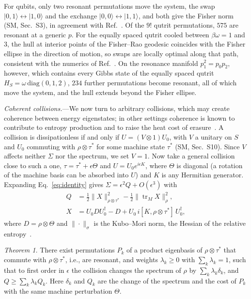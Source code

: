 \documentclass[aps,prl,reprint,superscriptaddress,amsmath,amssymb]{revtex4-2}
\newcommand{\Tr}{\operatorname{tr}}
\begin{document}
For qubits, only two resonant permutations move the system, the swap $|0,1\rangle\leftrightarrow|1,0\rangle$ and the
exchange $|0,0\rangle\leftrightarrow|1,1\rangle$, and both give the Fisher norm (SM, Sec.~S3), in agreement with
Ref.~\cite{Taranto2025}. Of the $9!$ qutrit permutations, $575$ are resonant at a generic $p$. For the equally spaced
qutrit cooled between $\beta\omega=1$ and $3$, the hull at interior points of the Fisher--Rao geodesic coincides with
the Fisher ellipse in the direction of motion, so swaps are locally optimal along that path, consistent with the
numerics of Ref.~\cite{Taranto2025}. On the resonance manifold $p_1^2=p_0p_2$, however, which contains every Gibbs
state of the equally spaced qutrit $H_S=\omega\,\mathrm{diag}(0,1,2)$, $234$ further permutations become resonant, all
of which move the system, and the hull extends beyond the Fisher ellipse.

\emph{Coherent collisions.}---We now turn to arbitrary collisions, which may create coherence between energy
eigenstates; in other settings coherence is known to contribute to entropy production and to raise the heat cost of
erasure~\cite{Santos2019,VanVuSaito2022}. A collision is dissipationless if and only if $U=(V\otimes1)U_0$, with $V$ a
unitary on $S$ and $U_0$ commuting with $\rho\otimes\tau^*$ for some machine state $\tau^*$ (SM, Sec.~S10). Since $V$
affects neither $\Sigma$ nor the spectrum, we set $V=1$. Now take a general collision close to such a one,
$\tau=\tau^*+\epsilon\Theta$ and $U=U_0e^{i\epsilon K}$, where $\Theta$ is diagonal (a rotation of the machine basis can
be absorbed into $U$) and $K$ is any Hermitian generator. Expanding Eq.~\eqref{eq:identity} gives
$\Sigma=\epsilon^2Q+O(\epsilon^3)$ with
\begin{equation}
\begin{aligned}
Q&=\tfrac12\|X\|^2_{\rho\otimes\tau^*}-\tfrac12\|\Tr_MX\|^2_{\rho},\\
X&=U_0DU_0^\dagger-D+U_0\,i[K,\rho\otimes\tau^*]\,U_0^\dagger,
\end{aligned}
\label{eq:Q}
\end{equation}
where $D=\rho\otimes\Theta$ and $\|\cdot\|_\sigma$ is the Kubo--Mori norm, the Hessian of the relative
entropy~\cite{Petz1996}.

\emph{Theorem 1.} There exist permutations $P_k$ of a product eigenbasis of $\rho\otimes\tau^*$ that commute with
$\rho\otimes\tau^*$, i.e., are resonant, and weights $\lambda_k\geq0$ with $\sum_k\lambda_k=1$, such that to first
order in $\epsilon$ the collision changes the spectrum of $\rho$ by $\sum_k\lambda_k\delta_k$, and
$Q\geq\sum_k\lambda_kQ_k$. Here $\delta_k$ and $Q_k$ are the change of the spectrum and the cost of $P_k$ with the
same machine perturbation $\Theta$.
\end{document}
